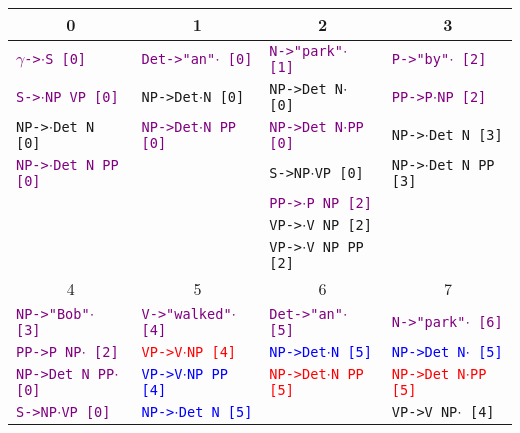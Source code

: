 \documentclass[a4paper]{article}
\begin{document}
\begin{enumerate}
\begin{table}[t]
\centering
\begin{tabular}{l|l|l|l}
\multicolumn{1}{c}{0} & \multicolumn{1}{c}{1} &\multicolumn{1}{c}{2} & \multicolumn{1}{c}{3} \\
\hline
\textcolor{purple}{$\gamma$\texttt{->}$\cdot$\texttt{S [0]}} & \textcolor{purple}{\texttt{Det->"an"}$\cdot$\texttt{ [0]}} & \textcolor{purple}{\texttt{N->"park"}$\cdot$\texttt{ [1]}} & \textcolor{purple}{\texttt{P->"by"}$\cdot$\texttt{ [2]}} \\
\textcolor{purple}{\texttt{S->}$\cdot$\texttt{NP VP [0]}} & \texttt{NP->Det}$\cdot$\texttt{N [0]} & \texttt{NP->Det N}$\cdot$\texttt{ [0]} & \textcolor{purple}{\texttt{PP->P}$\cdot$\texttt{NP [2]}} \\
\texttt{NP->}$\cdot$\texttt{Det N [0]} & \textcolor{purple}{\texttt{NP->Det}$\cdot$\texttt{N PP [0]}} & \textcolor{purple}{\texttt{NP->Det N}$\cdot$\texttt{PP [0]}} & \texttt{NP->}$\cdot$\texttt{Det N [3]} \\
\textcolor{purple}{\texttt{NP->}$\cdot$\texttt{Det N PP [0]}} & & \texttt{S->NP}$\cdot$\texttt{VP [0]} & \texttt{NP->}$\cdot$\texttt{Det N PP [3]} \\
 & & \textcolor{purple}{\texttt{PP->}$\cdot$\texttt{P NP [2]}} & \\
 & & \texttt{VP->}$\cdot$\texttt{V NP [2]} & \\
 & & \texttt{VP->}$\cdot$\texttt{V NP PP [2]} & \\
\hline
\multicolumn{1}{c}{4} & \multicolumn{1}{c}{5} & \multicolumn{1}{c}{6} & \multicolumn{1}{c}{7} \\
\hline
\textcolor{purple}{\texttt{NP->"Bob"}$\cdot$\texttt{ [3]}} & \textcolor{purple}{\texttt{V->"walked"}$\cdot$\texttt{ [4]}} & \textcolor{purple}{\texttt{Det->"an"}$\cdot$\texttt{ [5]}} & \textcolor{purple}{\texttt{N->"park"}$\cdot$\texttt{ [6]}} \\
\textcolor{purple}{\texttt{PP->P NP}$\cdot$\texttt{ [2]}} & \textcolor{red}{\texttt{VP->V}$\cdot$\texttt{NP [4]}} & \textcolor{blue}{\texttt{NP->Det}$\cdot$\texttt{N [5]}} & \textcolor{blue}{\texttt{NP->Det N}$\cdot$\texttt{ [5]}} \\
\textcolor{purple}{\texttt{NP->Det N PP}$\cdot$\texttt{ [0]}} & \textcolor{blue}{\texttt{VP->V}$\cdot$\texttt{NP PP [4]}} & \textcolor{red}{\texttt{NP->Det}$\cdot$\texttt{N PP [5]}} & \textcolor{red}{\texttt{NP->Det N}$\cdot$\texttt{PP [5]}} \\
\textcolor{purple}{\texttt{S->NP}$\cdot$\texttt{VP [0]}} & \textcolor{blue}{\texttt{NP->}$\cdot$\texttt{Det N [5]}} & & \texttt{VP->V NP}$\cdot$\texttt{ [4]} \\

\end{tabular}
\end{table}
\end{enumerate}
\end{document}
